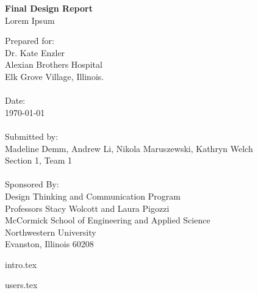 \documentclass{book}
\begin{document}

\frontmatter

\begin{titlepage}
   \begin{center}
      \huge\textbf{Final Design Report}\\
		\LARGE{Lorem Ipsum}\\  \leavevmode
   \end{center}
   
   \large
   \begin{tabbing}
	Prepare\=d for:\\
	\> Dr. Kate Enzler\\
	\> Alexian Brothers Hospital\\
	\> Elk Grove Village, Illinois.\\
	\\
	Date:\\
	\> \today\\
	\\
	Submitted by:\\
	\> Madeline Demm, Andrew Li, Nikola Maruszewski, Kathryn Welch\\
	\> Section 1, Team 1\\
	\\
	Sponsored By:\\
	\> Design Thinking and Communication Program\\
	\> Professors Stacy Wolcott and Laura Pigozzi\\
	\> McCormick School of Engineering and Applied Science\\
	\> Northwestern University\\
	\> Evanston, Illinois 60208\\
	\end{tabbing}
	\normalsize
\end{titlepage}


\listoftodos
\tableofcontents

\mainmatter

{intro.tex}

{users.tex}
\end{document}
